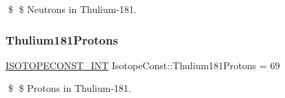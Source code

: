 \$ \$ Neutrons in Thulium-\/181. \mbox{\label{group___isotope_const-_thulium-_tm181_gac4d85895cf27380f21f9a5159d7ae523}} 
\subsubsection{\texorpdfstring{Thulium181\+Protons}{Thulium181Protons}}
{\footnotesize\ttfamily \mbox{\hyperlink{group___isotope_const-_macros_ga5f18360b3e99483a35c32d789e62621c}{I\+S\+O\+T\+O\+P\+E\+C\+O\+N\+S\+T\+\_\+\+I\+NT}} Isotope\+Const\+::\+Thulium181\+Protons = 69}

\$ \$ Protons in Thulium-\/181. 